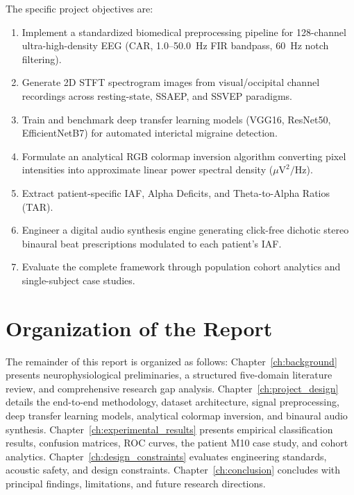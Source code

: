 \documentclass[12pt, a4paper]{report}
\begin{document}
The specific project objectives are:
\begin{enumerate}
    \item Implement a standardized biomedical preprocessing pipeline for 128-channel ultra-high-density EEG (CAR, 1.0--50.0~Hz FIR bandpass, 60~Hz notch filtering).
    \item Generate 2D STFT spectrogram images from visual/occipital channel recordings across resting-state, SSAEP, and SSVEP paradigms.
    \item Train and benchmark deep transfer learning models (VGG16, ResNet50, EfficientNetB7) for automated interictal migraine detection.
    \item Formulate an analytical RGB colormap inversion algorithm converting pixel intensities into approximate linear power spectral density ($\mu\text{V}^2/\text{Hz}$).
    \item Extract patient-specific IAF, Alpha Deficits, and Theta-to-Alpha Ratios (TAR).
    \item Engineer a digital audio synthesis engine generating click-free dichotic stereo binaural beat prescriptions modulated to each patient's IAF.
    \item Evaluate the complete framework through population cohort analytics and single-subject case studies.
\end{enumerate}

\section{Organization of the Report}
\label{sec:organization}
The remainder of this report is organized as follows: Chapter~\ref{ch:background} presents neurophysiological preliminaries, a structured five-domain literature review, and comprehensive research gap analysis. Chapter~\ref{ch:project_design} details the end-to-end methodology, dataset architecture, signal preprocessing, deep transfer learning models, analytical colormap inversion, and binaural audio synthesis. Chapter~\ref{ch:experimental_results} presents empirical classification results, confusion matrices, ROC curves, the patient M10 case study, and cohort analytics. Chapter~\ref{ch:design_constraints} evaluates engineering standards, acoustic safety, and design constraints. Chapter~\ref{ch:conclusion} concludes with principal findings, limitations, and future research directions.

\end{document}
